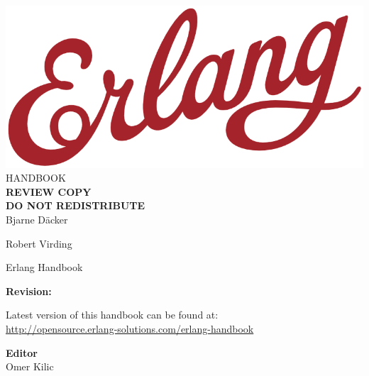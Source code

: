 \documentclass[oneside]{book}
\begin{document}
\begin{titlepage}
\centering

\vspace*{70pt}
\includegraphics[scale=0.3]{includes/erlang-logo.png}\\[0.8\baselineskip]
{\Huge \sffamily HANDBOOK}\\
\vspace{100pt}
{\Huge {\color{red}\textbf{REVIEW COPY\\DO NOT REDISTRIBUTE}}}\\
\vspace*{130pt}
{\LARGE \sffamily Bjarne Däcker}\par
{\LARGE \sffamily Robert Virding}\par

\end{titlepage}


\clearpage
\thispagestyle{empty}
{\Huge Erlang Handbook}\\[0.1\baselineskip]

\vspace{20pt}
{\Large \textbf{Revision:}\\[0.2\baselineskip]
\immediate{}

\immediate{}
}

\vspace{20pt}
{\large Latest version of this handbook can be found at:\\
\url{http://opensource.erlang-solutions.com/erlang-handbook}}

\vfill

\textbf{Editor}\\[0.1\baselineskip]
Omer Kilic
\end{document}
